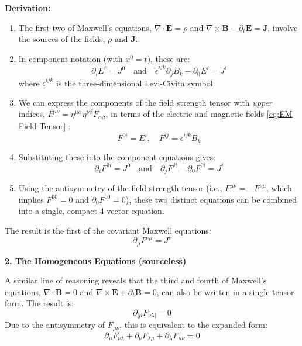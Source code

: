 \documentclass[11pt, a4paper]{report}
\begin{document}
\textbf{Derivation:}
\begin{enumerate}
    \item The first two of Maxwell's equations, $\nabla \cdot \mathbf{E} = \rho$ and $\nabla \times \mathbf{B} - \partial_t \mathbf{E} = \mathbf{J}$, involve the sources of the fields, $\rho$ and $\mathbf{J}$.
    \item In component notation (with $x^0=t$), these are:
    \[
        \partial_i E^i = J^0 \quad \text{and} \quad \tilde{\epsilon}^{ijk}\partial_j B_k - \partial_0 E^i = J^i
    \]
    where $\tilde{\epsilon}^{ijk}$ is the three-dimensional Levi-Civita symbol.
    \item We can express the components of the field strength tensor with \emph{upper} indices, $F^{\mu\nu} = \eta^{\mu\alpha}\eta^{\nu\beta}F_{\alpha\beta}$, in terms of the electric and magnetic fields \eqref{eq:EM Field Tensor} :
    \begin{equation}
        F^{0i} = E^i, \quad F^{ij} = \tilde{\epsilon}^{ijk}B_k
    \end{equation}
    \item Substituting these into the component equations gives:
    \begin{equation}
        \partial_i F^{0i} = J^0 \quad \text{and} \quad \partial_j F^{ji} - \partial_0 F^{0i} = J^i
    \end{equation}
    \item Using the antisymmetry of the field strength tensor (i.e., $F^{\mu\nu} = -F^{\nu\mu}$, which implies $F^{00}=0$ and $\partial_0 F^{00}=0$), these two distinct equations can be combined into a single, compact 4-vector equation.
\end{enumerate}
The result is the first of the covariant Maxwell equations:
\begin{equation}\label{eq:inhom-maxwell}
    \partial_\mu F^{\nu\mu} = J^\nu
\end{equation}

\textbf{2. The Homogeneous Equations (sourceless)}

A similar line of reasoning reveals that the third and fourth of Maxwell's equations, $\nabla \cdot \mathbf{B} = 0$ and $\nabla \times \mathbf{E} + \partial_t \mathbf{B} = 0$, can also be written in a single tensor form. The result is:
\begin{equation}\label{eq:hom-maxwell}
    \partial_{[\mu} F_{\nu\lambda]} = 0
\end{equation}
Due to the antisymmetry of $F_{\mu\nu}$, this is equivalent to the expanded form:
\begin{equation}
    \partial_\mu F_{\nu\lambda} + \partial_\nu F_{\lambda\mu} + \partial_\lambda F_{\mu\nu} = 0
\end{equation}
\end{document}
